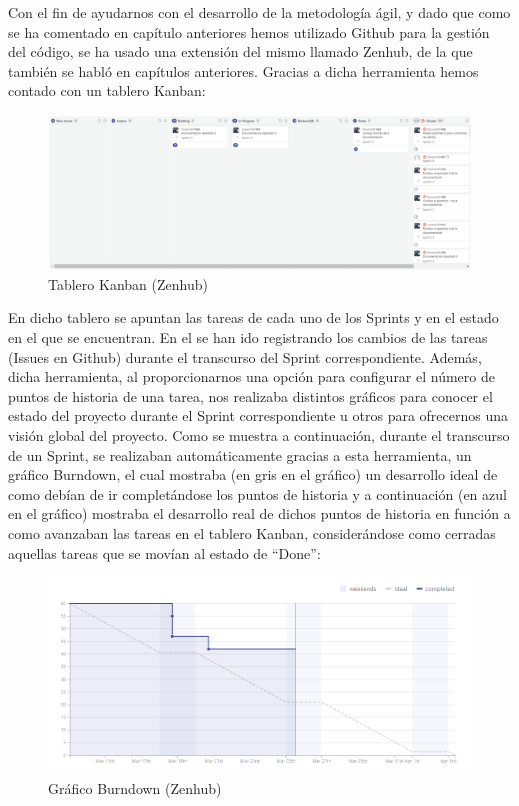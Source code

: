 \documentclass[11pt,openany]{book}
\begin{document}
Con el fin de ayudarnos con el desarrollo de la metodología ágil, y dado que como se ha comentado en capítulo anteriores hemos utilizado Github para la gestión del código, se ha usado una extensión del mismo llamado Zenhub, de la que también se habló en capítulos anteriores. Gracias a dicha herramienta hemos contado con un tablero Kanban:

\begin{figure}[H]
\centering
\includegraphics[totalheight=5cm]{kanban.png}
\caption{Tablero Kanban (Zenhub)}
\end{figure}
\par\bigskip 
\noindent

En dicho tablero se apuntan las tareas de cada uno de los Sprints y en el estado en el que se encuentran. En el se han ido registrando los cambios de las tareas (Issues en Github) durante el transcurso del Sprint correspondiente. Además, dicha herramienta, al proporcionarnos una opción para configurar el número de puntos de historia de una tarea, nos realizaba distintos gráficos para conocer el estado del proyecto durante el Sprint correspondiente u otros para ofrecernos una visión global del proyecto. Como se muestra a continuación, durante el transcurso de un Sprint, se realizaban automáticamente gracias a esta herramienta, un gráfico Burndown, el cual mostraba (en gris en el gráfico) un desarrollo ideal de como debían de ir completándose los puntos de historia y a continuación (en azul en el gráfico) mostraba el desarrollo real de dichos puntos de historia en función a como avanzaban las tareas en el tablero Kanban, considerándose como cerradas aquellas tareas que se movían al estado de ``Done'': 

\begin{figure}[H]
\centering
\includegraphics[totalheight=5cm]{zenhub_burndown.png}
\caption{Gráfico Burndown (Zenhub)}
\end{figure}
\par\bigskip 
\noindent
\end{document}
